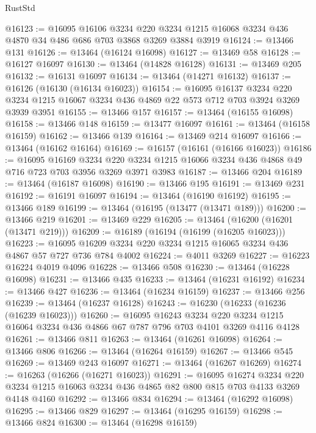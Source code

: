 \begin{lexlean}{RustStd}
\begin{coremodule}
@16123 := @16095
    @16106
    @3234
    @220
    @3234
    @1215
    @16068
    @3234
    @436
    @4870
    @34
    @486
    @686
    @703
    @3868
    @3269
    @3884
    @3919
@16124 := @13466 @131
@16126 := @13464 (@16124 @16098)
@16127 := @13469 @58
@16128 := @16127 @16097
@16130 := @13464 (@14828 @16128)
@16131 := @13469 @205
@16132 := @16131 @16097
@16134 := @13464 (@14271 @16132)
@16137 := @16126 (@16130 (@16134 @16023))
@16154 := @16095
    @16137
    @3234
    @220
    @3234
    @1215
    @16067
    @3234
    @436
    @4869
    @22
    @573
    @712
    @703
    @3924
    @3269
    @3939
    @3951
@16155 := @13466 @157
@16157 := @13464 (@16155 @16098)
@16158 := @13466 @148
@16159 := @13477 @16097
@16161 := @13464 (@16158 @16159)
@16162 := @13466 @139
@16164 := @13469 @214 @16097
@16166 := @13464 (@16162 @16164)
@16169 := @16157 (@16161 (@16166 @16023))
@16186 := @16095
    @16169
    @3234
    @220
    @3234
    @1215
    @16066
    @3234
    @436
    @4868
    @49
    @716
    @723
    @703
    @3956
    @3269
    @3971
    @3983
@16187 := @13466 @204
@16189 := @13464 (@16187 @16098)
@16190 := @13466 @195
@16191 := @13469 @231
@16192 := @16191 @16097
@16194 := @13464 (@16190 @16192)
@16195 := @13466 @189
@16199 := @13464 (@16195 (@13477 (@13471 @189)))
@16200 := @13466 @219
@16201 := @13469 @229
@16205 := @13464 (@16200 (@16201 (@13471 @219)))
@16209 := @16189 (@16194 (@16199 (@16205 @16023)))
@16223 := @16095 @16209 @3234 @220 @3234 @1215 @16065 @3234 @436 @4867 @57 @727 @736 @784 @4002
@16224 := @4011 @3269
@16227 := @16223 @16224 @4019 @4096
@16228 := @13466 @508
@16230 := @13464 (@16228 @16098)
@16231 := @13466 @435
@16233 := @13464 (@16231 @16192)
@16234 := @13466 @427
@16236 := @13464 (@16234 @16159)
@16237 := @13466 @256
@16239 := @13464 (@16237 @16128)
@16243 := @16230 (@16233 (@16236 (@16239 @16023)))
@16260 := @16095
    @16243
    @3234
    @220
    @3234
    @1215
    @16064
    @3234
    @436
    @4866
    @67
    @787
    @796
    @703
    @4101
    @3269
    @4116
    @4128
@16261 := @13466 @811
@16263 := @13464 (@16261 @16098)
@16264 := @13466 @806
@16266 := @13464 (@16264 @16159)
@16267 := @13466 @545
@16269 := @13469 @243 @16097
@16271 := @13464 (@16267 @16269)
@16274 := @16263 (@16266 (@16271 @16023))
@16291 := @16095
    @16274
    @3234
    @220
    @3234
    @1215
    @16063
    @3234
    @436
    @4865
    @82
    @800
    @815
    @703
    @4133
    @3269
    @4148
    @4160
@16292 := @13466 @834
@16294 := @13464 (@16292 @16098)
@16295 := @13466 @829
@16297 := @13464 (@16295 @16159)
@16298 := @13466 @824
@16300 := @13464 (@16298 @16159)

\end{coremodule}
\end{lexlean}
